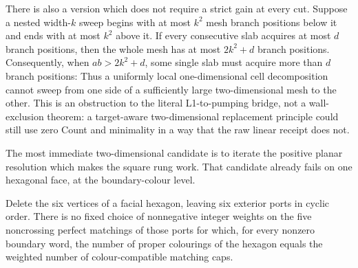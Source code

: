 There is also a version which does not require a strict gain at every cut.
Suppose a nested width-\(k\) sweep begins with at most \(k^2\) mesh branch
positions below it and ends with at most \(k^2\) above it.  If every consecutive
slab acquires at most \(d\) branch positions, then the whole mesh has at most
\(2k^2+d\) branch positions.  Consequently, when \(ab>2k^2+d\), some single
slab must acquire more than \(d\) branch positions:
Thus a uniformly local one-dimensional cell decomposition cannot sweep from
one side of a sufficiently large two-dimensional mesh to the other.  This is
an obstruction to the literal L1-to-pumping bridge, not a wall-exclusion
theorem: a target-aware two-dimensional replacement principle could still
use zero Count and minimality in a way that the raw linear receipt does not.

The most immediate two-dimensional candidate is to iterate the positive
planar resolution which makes the square rung work.  That candidate already
fails on one hexagonal face, at the boundary-colour level.

\begin{proposition}
\label{prop:hexagon-planar-pairing-obstruction}
Delete the six vertices of a facial hexagon, leaving six exterior ports in
cyclic order.  There is no fixed choice of nonnegative integer weights on the
five noncrossing perfect matchings of those ports for which, for every
nonzero boundary word, the number of proper colourings of the hexagon equals
the weighted number of colour-compatible matching caps.
\end{proposition}

